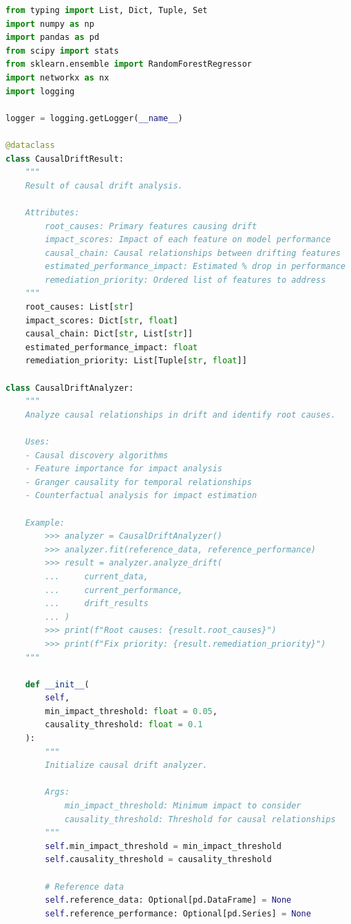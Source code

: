 \begin{lstlisting}[language=Python, caption={Causal Drift Analyzer with Root Cause Identification}]
from typing import List, Dict, Tuple, Set
import numpy as np
import pandas as pd
from scipy import stats
from sklearn.ensemble import RandomForestRegressor
import networkx as nx
import logging

logger = logging.getLogger(__name__)

@dataclass
class CausalDriftResult:
    """
    Result of causal drift analysis.

    Attributes:
        root_causes: Primary features causing drift
        impact_scores: Impact of each feature on model performance
        causal_chain: Causal relationships between drifting features
        estimated_performance_impact: Estimated % drop in performance
        remediation_priority: Ordered list of features to address
    """
    root_causes: List[str]
    impact_scores: Dict[str, float]
    causal_chain: Dict[str, List[str]]
    estimated_performance_impact: float
    remediation_priority: List[Tuple[str, float]]

class CausalDriftAnalyzer:
    """
    Analyze causal relationships in drift and identify root causes.

    Uses:
    - Causal discovery algorithms
    - Feature importance for impact analysis
    - Granger causality for temporal relationships
    - Counterfactual analysis for impact estimation

    Example:
        >>> analyzer = CausalDriftAnalyzer()
        >>> analyzer.fit(reference_data, reference_performance)
        >>> result = analyzer.analyze_drift(
        ...     current_data,
        ...     current_performance,
        ...     drift_results
        ... )
        >>> print(f"Root causes: {result.root_causes}")
        >>> print(f"Fix priority: {result.remediation_priority}")
    """

    def __init__(
        self,
        min_impact_threshold: float = 0.05,
        causality_threshold: float = 0.1
    ):
        """
        Initialize causal drift analyzer.

        Args:
            min_impact_threshold: Minimum impact to consider
            causality_threshold: Threshold for causal relationships
        """
        self.min_impact_threshold = min_impact_threshold
        self.causality_threshold = causality_threshold

        # Reference data
        self.reference_data: Optional[pd.DataFrame] = None
        self.reference_performance: Optional[pd.Series] = None


\end{lstlisting}
